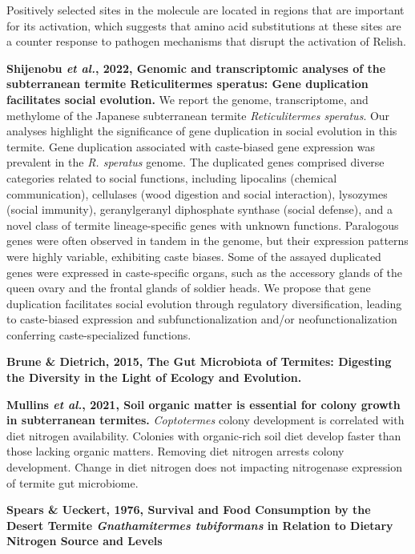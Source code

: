 \documentclass[11pt]{article}
\begin{document}
\begin{sloppypar}
Positively selected sites in the molecule are located in regions that are important for its activation, which suggests that amino acid substitutions at these sites are a counter response to pathogen mechanisms that disrupt the activation of Relish.
\par
\textbf{Shijenobu \textit{et al.}, 2022, Genomic and transcriptomic analyses of the subterranean termite Reticulitermes speratus: Gene duplication facilitates social evolution.} \newline
We report the genome, transcriptome, and methylome of the Japanese subterranean termite \textit{Reticulitermes speratus}. 
Our analyses highlight the significance of gene duplication in social evolution in this termite. 
Gene duplication associated with caste-biased gene expression was prevalent in the \textit{R. speratus} genome. 
The duplicated genes comprised diverse categories related to social functions, including lipocalins (chemical communication), cellulases (wood digestion and social interaction), lysozymes (social immunity), geranylgeranyl diphosphate synthase (social defense), and a novel class of termite lineage-specific genes with unknown functions. 
Paralogous genes were often observed in tandem in the genome, but their expression patterns were highly variable, exhibiting caste biases. 
Some of the assayed duplicated genes were expressed in caste-specific organs, such as the accessory glands of the queen ovary and the frontal glands of soldier heads. 
We propose that gene duplication facilitates social evolution through regulatory diversification, leading to caste-biased expression and subfunctionalization and/or neofunctionalization conferring caste-specialized functions.
\par
\textbf{Brune & Dietrich, 2015, The Gut Microbiota of Termites: Digesting the Diversity in the Light of Ecology and Evolution.} \newline
\par
\textbf{Mullins \textit{et al.}, 2021, Soil organic matter is essential for colony growth in subterranean termites.} \newline
\textit{Coptotermes} colony development is correlated with diet nitrogen availability. 
Colonies with organic-rich soil diet develop faster than those lacking organic matters. 
Removing diet nitrogen arrests colony development. 
Change in diet nitrogen does not impacting nitrogenase expression of termite gut microbiome. 
\par
\textbf{Spears & Ueckert, 1976, Survival and Food Consumption by the Desert Termite \textit{Gnathamitermes tubiformans} in Relation to Dietary Nitrogen Source and Levels} \newline

\end{sloppypar}
\end{document}

